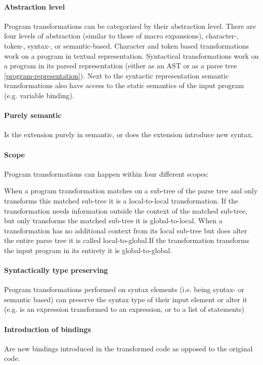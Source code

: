 \paragraph{Abstraction level}
Program transformations can be categorized by their abstraction level. There are four levels of abstraction (similar to those of macro expansions\cite{Weise1993}), character-, token-, syntax-, or semantic-based. Character and token based transformations work on a program in textual representation. Syntactical transformations work on a program in its parsed representation (either as an AST or as a parse tree \ref{program-representation}). Next to the syntactic representation semantic transformations also have access to the static semantics of the input program (e.g. variable binding).

\paragraph{Purely semantic}
Is the extension purely in semantic, or does the extension introduce new syntax.

\paragraph{Scope}
Program transformations can happen within four different scopes: 

When a program transformation matches on a sub-tree of the parse tree and only transforms this matched sub-tree it is a local-to-local transformation. If the transformation needs information outside the context of the matched sub-tree, but only transforms the matched sub-tree it is global-to-local. When a transformation has no additional context from its local sub-tree but does alter the entire parse tree it is called local-to-global.If the transformation transforms the input program in its entirety it is global-to-global.  

\paragraph{Syntactically type preserving}
Program transformations performed on syntax elements (i.e. being syntax- or semantic based) can preserve the syntax type of their input element or alter it (e.g. is an expression transformed to an expression, or to a list of statements)

\paragraph{Introduction of bindings}
Are new bindings introduced in the transformed code as opposed to the original code.

